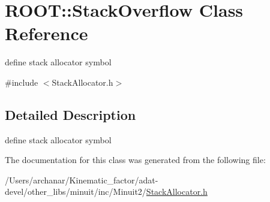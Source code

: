 \hypertarget{classROOT_1_1Minuit2_1_1StackOverflow}{}\section{R\+O\+OT\+:\+:Stack\+Overflow Class Reference}
\label{classROOT_1_1Minuit2_1_1StackOverflow}


define stack allocator symbol  




{\ttfamily \#include $<$Stack\+Allocator.\+h$>$}



\subsection{Detailed Description}
define stack allocator symbol 

The documentation for this class was generated from the following file\+:\begin{DoxyCompactItemize}
\item 
/\+Users/archanar/\+Kinematic\+\_\+factor/adat-\/devel/other\+\_\+libs/minuit/inc/\+Minuit2/\mbox{\hyperlink{adat-devel_2other__libs_2minuit_2inc_2Minuit2_2StackAllocator_8h}{Stack\+Allocator.\+h}}\end{DoxyCompactItemize}
